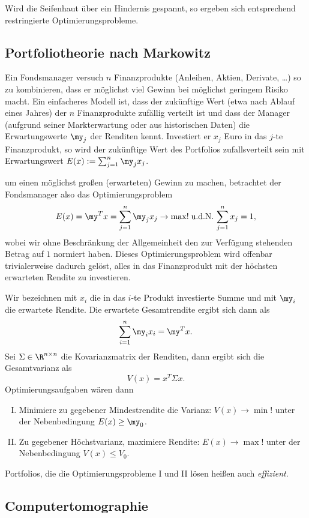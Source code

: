 Wird die Seifenhaut über ein Hindernis gespannt, so ergeben sich entsprechend restringierte Optimierungsprobleme.

\subsection{Portfoliotheorie nach Markowitz}

Ein Fondsmanager versuch $n$ Finanzprodukte (Anleihen, Aktien, Derivate, \dots) so zu kombinieren, dass er möglichst viel Gewinn bei möglichst geringem Risiko macht.
Ein einfacheres Modell ist, dass der zukünftige Wert (etwa nach Ablauf eines Jahres) der $n$ Finanzprodukte zufällig verteilt ist und dass der Manager (aufgrund seiner Markterwartung oder aus historischen Daten) die Erwartungswerte $\my_j$ der Renditen kennt.
Investiert er $x_j$ Euro in das $j$-te Finanzprodukt, so wird der zukünftige Wert des Portfolios zufallsverteilt sein mit Erwartungswert $E(x) := \sum_{j=1}^n \my_j x_j$.

um einen möglichst großen (erwarteten) Gewinn zu machen, betrachtet der Fondsmanager also das Optimierungsproblem
\[
	E(x) = \my^Tx = \sum_{j=1}^n \my_j x_j \to \max!
	\udN
	\sum_{j=1}^n x_j = 1,
\]
wobei wir ohne Beschränkung der Allgemeinheit den zur Verfügung stehenden Betrag auf $1$ normiert haben.
Dieses Optimierungsproblem wird offenbar trivialerweise dadurch gelöst, alles in das Finanzprodukt mit der höchsten erwarteten Rendite zu investieren.


Wir bezeichnen mit $x_i$ die in das $i$-te Produkt investierte Summe und mit $\my_i$ die erwartete Rendite.
Die erwartete Gesamtrendite ergibt sich dann als
\[
	\sum_{i=1}^n \my_i x_i = \my^T x.
\]
Sei $\Sigma \in \R^{n\times n}$ die Kovarianzmatrix der Renditen, dann ergibt sich die Gesamtvarianz als
\[
	V(x) = x^T \Sigma x.
\]
Optimierungsaufgaben wären dann
\begin{enumerate}[I.]
	\item
		Minimiere zu gegebener Mindestrendite die Varianz:
		$V(x) \to \min!$ unter der Nebenbedingung $E(x) \ge \my_0$.
	\item
		Zu gegebener Höchstvarianz, maximiere Rendite:
		$E(x) \to \max!$ unter der Nebenbedingung $V(x) \le V_0$.
\end{enumerate}
Portfolios, die die Optimierungsprobleme I und II lösen heißen auch \emph{effizient}.

\subsection{Computertomographie}

